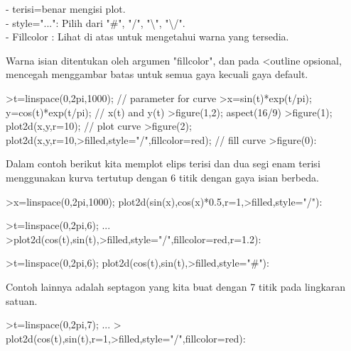 \documentclass[a4paper,10pt]{article}
\begin{document}
\begin{eulernotebook}
\begin{eulercomment}
\begin{eulercomment}
\begin{eulercomment}
\begin{eulercomment}
\begin{eulercomment}
- terisi=benar mengisi plot.\\
- style="...": Pilih dari "#", "/", "\textbackslash{}", "\textbackslash{}/".\\
- Fillcolor : Lihat di atas untuk mengetahui warna yang tersedia.

Warna isian ditentukan oleh argumen "fillcolor", dan pada \textless{}outline
opsional, mencegah menggambar batas untuk semua gaya kecuali gaya
default.
\end{eulercomment}
\begin{eulerprompt}
>t=linspace(0,2pi,1000); // parameter for curve
>x=sin(t)*exp(t/pi); y=cos(t)*exp(t/pi); // x(t) and y(t)
>figure(1,2); aspect(16/9)
>figure(1); plot2d(x,y,r=10); // plot curve
>figure(2); plot2d(x,y,r=10,>filled,style="/",fillcolor=red); // fill curve
>figure(0):
\end{eulerprompt}
\begin{eulercomment}
Dalam contoh berikut kita memplot elips terisi dan dua segi enam
terisi menggunakan kurva tertutup dengan 6 titik dengan gaya isian
berbeda.
\end{eulercomment}
\begin{eulerprompt}
>x=linspace(0,2pi,1000); plot2d(sin(x),cos(x)*0.5,r=1,>filled,style="/"):
\end{eulerprompt}
\begin{eulerprompt}
>t=linspace(0,2pi,6); ...
>plot2d(cos(t),sin(t),>filled,style="/",fillcolor=red,r=1.2):
\end{eulerprompt}
\begin{eulerprompt}
>t=linspace(0,2pi,6); plot2d(cos(t),sin(t),>filled,style="#"):
\end{eulerprompt}
\begin{eulercomment}
Contoh lainnya adalah septagon yang kita buat dengan 7 titik pada
lingkaran satuan.
\end{eulercomment}
\begin{eulerprompt}
>t=linspace(0,2pi,7);  ...
> plot2d(cos(t),sin(t),r=1,>filled,style="/",fillcolor=red):
\end{eulerprompt}
\begin{eulercomment}

\end{eulercomment}
\end{eulercomment}
\end{eulercomment}
\end{eulercomment}
\end{eulercomment}
\end{eulernotebook}
\end{document}
